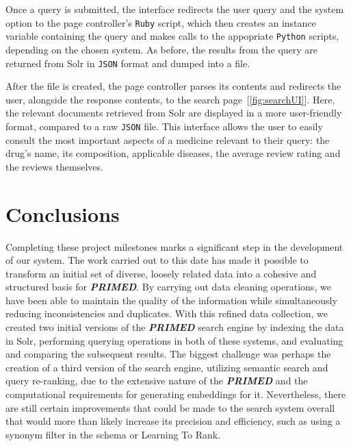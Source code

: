 \documentclass[sigconf]{acmart}
\begin{document}
Once a query is submitted, the interface redirects the user query and the system option to the page controller's \texttt{Ruby} script, which then creates an instance variable\cite{instancevars} containing the query and makes calls to the appopriate \texttt{Python} scripts, depending on the chosen system. As before, the results from the query are returned from Solr in \texttt{JSON} format and dumped into a file.

After the file is created, the page controller parses its contents and redirects the user, alongside the response contents, to the search page~[\ref{fig:searchUI}]. Here, the relevant documents retrieved from Solr are displayed in a more user-friendly format, compared to a raw \texttt{JSON} file. This interface allows the user to easily consult the most important aspects of a medicine relevant to their query: the drug's name, its composition, applicable diseases, the average review rating and the reviews themselves.

\section{Conclusions}

Completing these project milestones marks a significant step in the development of our system. The work carried out to this date has made it possible to transform an initial set of diverse, loosely related data into a cohesive and structured basis for \textit{\textbf{PRIMED}}. By carrying out data cleaning operations, we have been able to maintain the quality of the information while simultaneously reducing inconsistencies and duplicates. With this refined data collection, we created two initial versions of the \textit{\textbf{PRIMED}} search engine by indexing the data in Solr, performing querying operations in both of these systems, and evaluating and comparing the subsequent results. The biggest challenge was perhaps the creation of a third version of the search engine, utilizing semantic search and query re-ranking, due to the extensive nature of the \textit{\textbf{PRIMED}} and the computational requirements for generating embeddings for it. Nevertheless, there are still certain improvements that could be made to the search system overall that would more than likely increase its precision and efficiency, such as using a synonym filter in the schema or Learning To Rank.



\end{document}
